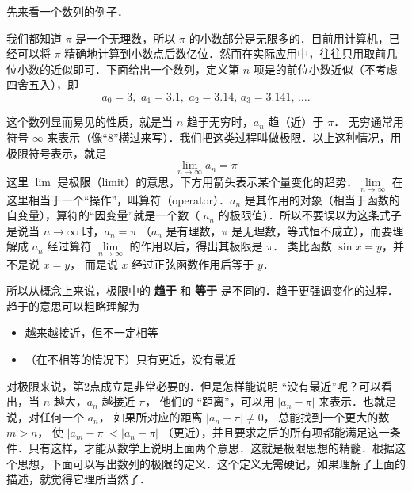 
先来看一个数列的例子．

\begin{exam}{}
我们都知道 $\pi$ 是一个无理数，所以 $\pi$ 的小数部分是无限多的．目前用计算机，已经可以将 $\pi$ 精确地计算到小数点后数亿位．然而在实际应用中，往往只用取前几位小数的近似即可．下面给出一个数列，定义第 $n$ 项是的前位小数近似（不考虑四舍五入），即
\begin{equation}
{a_0} = 3,\,\,{a_1} = 3.1,\,\,{a_2} = 3.14,\,{a_3} = 3.141,\,\dots.
\end{equation}
\end{exam}

这个数列显而易见的性质，就是当 $n$ 趋于无穷时，$a_n$ 趋（近）于 $\pi$． 无穷通常用符号 $\infty$ 来表示（像“8”横过来写）．我们把这类过程叫做极限．以上这种情况，用极限符号表示，就是
\begin{equation}
\mathop {\lim }\limits_{n \to \infty } {a_n} = \pi 
\end{equation}
这里 $\lim$ 是极限（limit）的意思，下方用箭头表示某个量变化的趋势．$\mathop {\lim }\limits_{n \to \infty }$ 在这里相当于一个“操作”，叫算符（operator）．$a_n$ 是其作用的对象（相当于函数的自变量），算符的“因变量”就是一个数（ $a_n$ 的极限值）．所以不要误以为这条式子是说当 $n \to \infty$ 时，$a_n=\pi$ （$a_n$ 是有理数，$\pi$ 是无理数，等式恒不成立），而要理解成 $a_n$ 经过算符 $\mathop {\lim }\limits_{n \to \infty }$ 的作用以后，得出其极限是 $\pi$． 类比函数 $\sin x = y$，并不是说 $x=y$， 而是说 $x$ 经过正弦函数作用后等于 $y$． 

所以从概念上来说，极限中的 \textbf{趋于} 和 \textbf{等于} 是不同的．趋于更强调变化的过程．趋于的意思可以粗略理解为
\begin{itemize}
\item 越来越接近，但不一定相等
\item （在不相等的情况下）只有更近，没有最近
\end{itemize}

对极限来说，第2点成立是非常必要的．但是怎样能说明 “没有最近”呢？可以看出，当 $n$ 越大，$a_n$ 越接近 $\pi$， 他们的 “距离”，可以用 $\left| {{a_n} - \pi } \right|$ 来表示．也就是说，对任何一个 $a_n$， 如果所对应的距离 $\left| {{a_n} - \pi } \right| \ne 0$， 总能找到一个更大的数 $m>n$， 使 $\left| {{a_m} - \pi } \right| < \left| {{a_n} - \pi } \right|$ （更近），并且要求之后的所有项都能满足这一条件．只有这样，才能从数学上说明上面两个意思．这就是极限思想的精髓．根据这个思想，下面可以写出数列的极限的定义．这个定义无需硬记，如果理解了上面的描述，就觉得它理所当然了．

